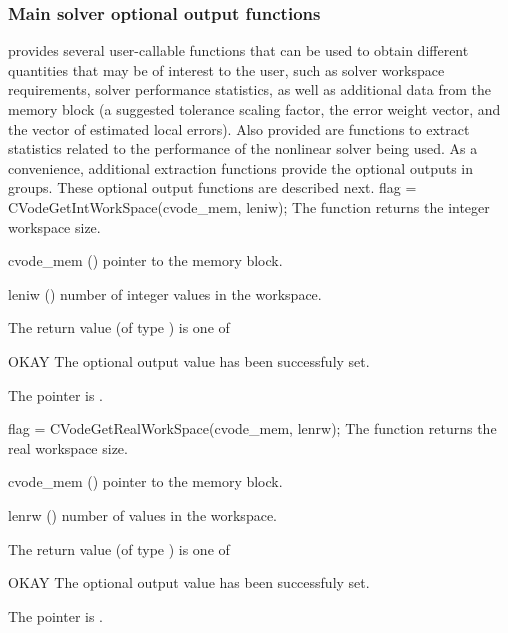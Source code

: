 \subsubsection{Main solver optional output functions}
{\cvode} provides several user-callable functions that can be used to obtain
different quantities that may be of interest to the user, such as solver workspace
requirements, solver performance statistics, as well as additional data from
the {\cvode} memory block (a suggested tolerance scaling factor, the error weight
vector, and the vector of estimated local errors). Also provided are functions to
extract statistics related to the performance of the {\cvode} nonlinear solver
being used. As a convenience, additional extraction functions provide the optional 
outputs in groups.
These optional output functions are described next.
{
  flag = CVodeGetIntWorkSpace(cvode\_mem, leniw);
}
{
  The function  returns the
  {\cvode} integer workspace size.
}
{
  \begin{args}
  \item[cvode\_mem] ()
    pointer to the {\cvode} memory block.
  \item[leniw] ()
    number of integer values in the {\cvode} workspace.
  \end{args}
}
{
  The return value  (of type ) is one of
  \begin{args}
  \item[OKAY] 
    The optional output value has been successfuly set.
  \item[\Id{CVG\_NO\_MEM}]
    The  pointer is .
  \end{args}
}
{}
{
  flag = CVodeGetRealWorkSpace(cvode\_mem, lenrw);
}
{
  The function  returns the
  {\cvode} real workspace size.
}
{
  \begin{args}
  \item[cvode\_mem] ()
    pointer to the {\cvode} memory block.
  \item[lenrw] ()
    number of  values in the {\cvode} workspace.
  \end{args}
}
{
  The return value  (of type ) is one of
  \begin{args}
  \item[OKAY] 
    The optional output value has been successfuly set.
  \item[\Id{CVG\_NO\_MEM}]
    The  pointer is .
  \end{args}
}
